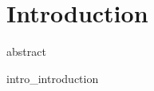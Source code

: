 \chapter{Introduction}
\label{cha:introduction}
\glsresetall
{abstract}



\clearpage
\glsresetall
{intro_introduction}
